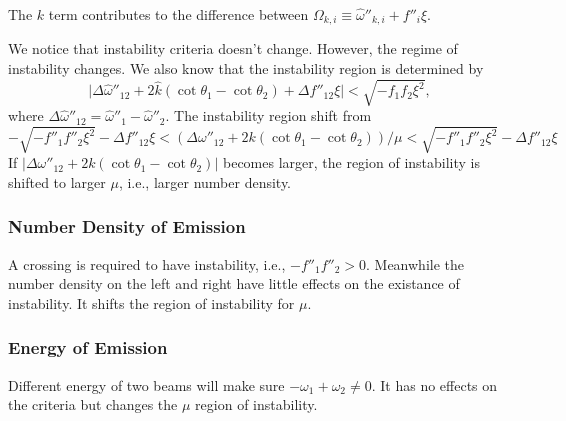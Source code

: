 The $k$ term contributes to the difference between $\Omega_{k,i}\equiv \hat\omega''_{k,i}+ f''_i\xi$.

We notice that instability criteria doesn't change. However, the regime of instability changes. We also know that the instability region is determined by
\begin{equation}
   \lvert \Delta\hat\omega''_{12} + 2\hat k (\cot \theta_1 - \cot\theta_2) + \Delta f''_{12}\xi \rvert < \sqrt{-f_1f_2\xi^2},
\end{equation}
where $\Delta \hat \omega''_{12} = \hat\omega''_1-\hat\omega''_2$. The instability region shift from
\begin{equation}
   -\sqrt{-f''_1f''_2\xi^2} -\Delta f''_{12}\xi < (\Delta\omega''_{12} + 2 k(\cot\theta_1-\cot\theta_2))/\mu < \sqrt{-f''_1f''_2\xi^2} -\Delta f''_{12}\xi
\end{equation}
If $\lvert \Delta\omega''_{12} + 2 k(\cot\theta_1-\cot\theta_2) \rvert$ becomes larger, the region of instability is shifted to larger $\mu$, i.e., larger number density.



\subsubsection{Number Density of Emission}


A crossing is required to have instability, i.e., $-f''_1f''_2>0$. Meanwhile the number density on the left and right have little effects on the existance of instability. It shifts the region of instability for $\mu$.


\subsubsection{Energy of Emission}



Different energy of two beams will make sure $-\omega_1 + \omega_2\neq 0$. It has no effects on the criteria but changes the $\mu$ region of instability.







